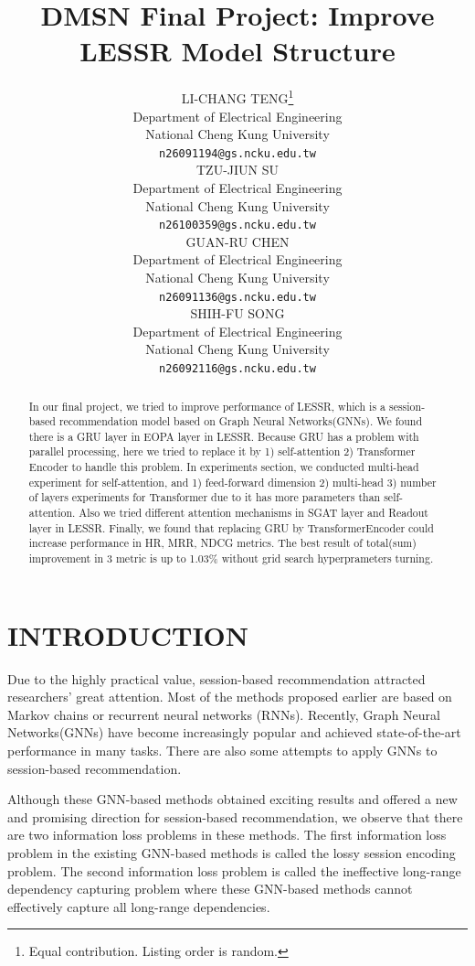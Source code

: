 \documentclass{article}
\title{DMSN Final Project: Improve LESSR Model Structure}
\author{%
  LI-CHANG TENG\thanks{Equal contribution. Listing order is random.}\\
  Department of Electrical Engineering\\
  National Cheng Kung University\\
  \texttt{n26091194@gs.ncku.edu.tw} \\
  \And
  TZU-JIUN SU\samethanks\\
  Department of Electrical Engineering\\
  National Cheng Kung University\\
  \texttt{n26100359@gs.ncku.edu.tw} \\
  \AND
  GUAN-RU CHEN\samethanks\\
  Department of Electrical Engineering\\
  National Cheng Kung University\\
  \texttt{n26091136@gs.ncku.edu.tw} \\
  \And
  SHIH-FU SONG\samethanks\\
  Department of Electrical Engineering\\
  National Cheng Kung University\\
  \texttt{n26092116@gs.ncku.edu.tw} \\
}
\begin{document}
\maketitle


\begin{abstract}
    In our final project, we tried to improve performance of LESSR\cite{chen2020lessr},
    which is a session-based recommendation model based on Graph Neural Networks(GNNs)\cite{4700287}.
    We found there is a GRU\cite{chung2014empirical} layer in EOPA layer in LESSR\cite{chen2020lessr}.
    Because GRU\cite{chung2014empirical} has a problem with parallel processing,
    here we tried to replace it by 1) self-attention\cite{vaswani2017attention}
    2) Transformer Encoder\cite{vaswani2017attention} to handle this problem.
    In experiments section, we conducted multi-head experiment for self-attention,
    and 1) feed-forward dimension 2) multi-head 3) number of layers experiments
    for Transformer due to it has more parameters than self-attention.
    Also we tried different attention mechanisms in SGAT layer
    and Readout layer in LESSR\cite{chen2020lessr}.
    Finally, we found that replacing GRU\cite{chung2014empirical} by TransformerEncoder\cite{vaswani2017attention}
    could increase performance in HR, MRR, NDCG metrics.
    The best result of total(sum) improvement in 3 metric is up to 1.03\%
    without grid search hyperprameters turning.
\end{abstract}


\section{INTRODUCTION}

Due to the highly practical value,
session-based recommendation attracted researchers’ great attention.
Most of the methods proposed earlier are based on Markov chains or
recurrent neural networks (RNNs). Recently, Graph Neural Networks(GNNs)\cite{4700287}
have become increasingly popular and achieved state-of-the-art performance
in many tasks. There are also some attempts to apply GNNs
to session-based recommendation.

Although these GNN-based methods obtained exciting results and
offered a new and promising direction for session-based recommendation,
we observe that there are two information loss problems in these methods.
The first information loss problem in the existing GNN-based methods
is called the lossy session encoding problem.
The second information loss problem is called the
ineffective long-range dependency capturing problem where
these GNN-based methods cannot effectively capture all long-range dependencies.
\end{document}
